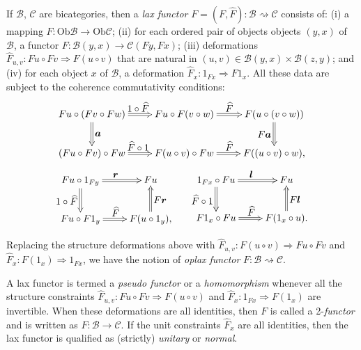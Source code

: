\documentclass[]{amsart}
\begin{document}
If ${\ensuremath{\mathcal{B}}}$, ${\ensuremath{\mathcal{C}}}$ are  bicategories, then a {\em lax functor} $ F=(F,\widehat{F}):{\ensuremath{\mathcal{B}}} \rightsquigarrow
{\ensuremath{\mathcal{C}}}$ consists of: (i) a mapping $F:\mbox{Ob}{\ensuremath{\mathcal{B}}}\to \mbox{Ob}{\ensuremath{\mathcal{C}}}$; (ii)
 for each ordered pair of objects objects $(y,x)$ of ${\ensuremath{\mathcal{B}}}$, a functor $F:{\ensuremath{\mathcal{B}}}(y,x)\to {\ensuremath{\mathcal{C}}}(Fy,Fx)$; (iii) deformations $\widehat{F}_{u,v}:Fu\circ Fv\Rightarrow F(u\circ v)$ that are natural in $(u,v)\in{\ensuremath{\mathcal{B}}}(y,x)\times{\ensuremath{\mathcal{B}}}(z,y)$; and (iv) for each object $x$ of ${\ensuremath{\mathcal{B}}}$, a deformation $\widehat{F}_x:1_{Fx}\Rightarrow F1_x$. All these data are subject to the coherence commutativity conditions:
$$
\xymatrix{ Fu\circ (Fv\circ Fw)\ar@{=>}[r]^{\textstyle 1\circ \widehat{F}}\ar@{=>}[d]^{\textstyle
\boldsymbol{a}}&Fu\circ F(v\circ w)\ar@{=>}[r]^{\textstyle \widehat{F}}&
F(u\circ(v\circ w))\ar@{=>}[d]_{\textstyle F\boldsymbol{a}}\\
(Fu\circ Fv)\circ Fw\ar@{=>}[r]^{\textstyle \widehat{F}\circ 1}&F(u\circ v)\circ Fw
\ar@{=>}[r]^{\textstyle \widehat{F}}&F((u\circ v)\circ w),}
 $$
 $$
 \xymatrix{Fu\circ 1_{Fy}\ar@{=>}[r]^{\textstyle \boldsymbol{r}}\ar@{=>}[d]_{\textstyle 1\circ \widehat{F}}&Fu
 \\ Fu\circ F1_y\ar@{=>}[r]^{\textstyle \widehat{F}}&F(u\circ 1_y),\ar@{=>}[u]_{\textstyle F\boldsymbol{r}}}\hspace{0.5cm}
 \xymatrix{1_{Fx}\circ Fu\ar@{=>}[r]^{\textstyle \boldsymbol{l}}\ar@{=>}[d]_{\textstyle \widehat{F}\circ 1}&Fu
 \\ F1_x\circ Fu\ar@{=>}[r]^{\textstyle \widehat{F}}&F(1_x\circ u).\ar@{=>}[u]_{\textstyle F\boldsymbol{l}}}
 $$

 Replacing the structure deformations above with $\widehat{F}_{u,v}:F(u\circ v)\Rightarrow Fu\circ Fv$ and $\widehat{F}_x: F(1_x)\Rightarrow 1_{Fx}$, we have the notion of {\em oplax functor} $F: {\ensuremath{\mathcal{B}}}\rightsquigarrow {\ensuremath{\mathcal{C}}}$.

A lax functor is termed a {\em pseudo functor} or a {\em homomorphism} whenever all the structure
constraints $\widehat{F}_{u,v}:Fu\circ Fv\Rightarrow F(u\circ v)$ and
$\widehat{F}_x:1_{Fx}\Rightarrow F(1_x)$ are invertible. When these deformations are all
identities, then $F$ is called a 2-{\em functor} and is written as $F:{\ensuremath{\mathcal{B}}}\to{\ensuremath{\mathcal{C}}}$. If the unit
constraints $\widehat{F}_x$ are all identities, then the lax functor is qualified as (strictly)
{\em unitary} or {\em normal}.
\end{document}
